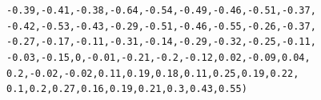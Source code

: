 \documentclass{article}\usepackage[]{graphicx}\usepackage[]{xcolor}
\makeatletter
\newcommand{\hlnum}[1]{\textcolor[rgb]{0.686,0.059,0.569}{#1}}%
\newcommand{\hlopt}[1]{\textcolor[rgb]{0,0,0}{#1}}%
\newcommand{\hlstd}[1]{\textcolor[rgb]{0.345,0.345,0.345}{#1}}%
\newenvironment{kframe}{%
 \def\at@end@of@kframe{}%
 \ifinner\ifhmode%
  \def\at@end@of@kframe{\end{minipage}}%
  \begin{minipage}{\columnwidth}%
 \fi\fi%
 \def\FrameCommand##1{\hskip\@totalleftmargin \hskip-\fboxsep
 \colorbox{shadecolor}{##1}\hskip-\fboxsep
     \hskip-\linewidth \hskip-\@totalleftmargin \hskip\columnwidth}%
 \MakeFramed {\advance\hsize-\width
   \@totalleftmargin\z@ \linewidth\hsize
   \@setminipage}}%
 {\par\unskip\endMakeFramed%
 \at@end@of@kframe}
\newenvironment{knitrout}{}{} %
\makeatother
\begin{document}
\begin{knitrout}
\begin{kframe}
\begin{alltt}
    \hlopt{-}\hlnum{0.39}\hlstd{,} \hlopt{-}\hlnum{0.41}\hlstd{,} \hlopt{-}\hlnum{0.38}\hlstd{,} \hlopt{-}\hlnum{0.64}\hlstd{,} \hlopt{-}\hlnum{0.54}\hlstd{,} \hlopt{-}\hlnum{0.49}\hlstd{,} \hlopt{-}\hlnum{0.46}\hlstd{,} \hlopt{-}\hlnum{0.51}\hlstd{,} \hlopt{-}\hlnum{0.37}\hlstd{,}
    \hlopt{-}\hlnum{0.42}\hlstd{,} \hlopt{-}\hlnum{0.53}\hlstd{,} \hlopt{-}\hlnum{0.43}\hlstd{,} \hlopt{-}\hlnum{0.29}\hlstd{,} \hlopt{-}\hlnum{0.51}\hlstd{,} \hlopt{-}\hlnum{0.46}\hlstd{,} \hlopt{-}\hlnum{0.55}\hlstd{,} \hlopt{-}\hlnum{0.26}\hlstd{,} \hlopt{-}\hlnum{0.37}\hlstd{,}
    \hlopt{-}\hlnum{0.27}\hlstd{,} \hlopt{-}\hlnum{0.17}\hlstd{,} \hlopt{-}\hlnum{0.11}\hlstd{,} \hlopt{-}\hlnum{0.31}\hlstd{,} \hlopt{-}\hlnum{0.14}\hlstd{,} \hlopt{-}\hlnum{0.29}\hlstd{,} \hlopt{-}\hlnum{0.32}\hlstd{,} \hlopt{-}\hlnum{0.25}\hlstd{,} \hlopt{-}\hlnum{0.11}\hlstd{,}
    \hlopt{-}\hlnum{0.03}\hlstd{,} \hlopt{-}\hlnum{0.15}\hlstd{,} \hlnum{0}\hlstd{,} \hlopt{-}\hlnum{0.01}\hlstd{,} \hlopt{-}\hlnum{0.21}\hlstd{,} \hlopt{-}\hlnum{0.2}\hlstd{,} \hlopt{-}\hlnum{0.12}\hlstd{,} \hlnum{0.02}\hlstd{,} \hlopt{-}\hlnum{0.09}\hlstd{,} \hlnum{0.04}\hlstd{,}
    \hlnum{0.2}\hlstd{,} \hlopt{-}\hlnum{0.02}\hlstd{,} \hlopt{-}\hlnum{0.02}\hlstd{,} \hlnum{0.11}\hlstd{,} \hlnum{0.19}\hlstd{,} \hlnum{0.18}\hlstd{,} \hlnum{0.11}\hlstd{,} \hlnum{0.25}\hlstd{,} \hlnum{0.19}\hlstd{,} \hlnum{0.22}\hlstd{,}
    \hlnum{0.1}\hlstd{,} \hlnum{0.2}\hlstd{,} \hlnum{0.27}\hlstd{,} \hlnum{0.16}\hlstd{,} \hlnum{0.19}\hlstd{,} \hlnum{0.21}\hlstd{,} \hlnum{0.3}\hlstd{,} \hlnum{0.43}\hlstd{,} \hlnum{0.55}\hlstd{)}


\end{alltt}
\end{kframe}
\end{knitrout}
\end{document}
